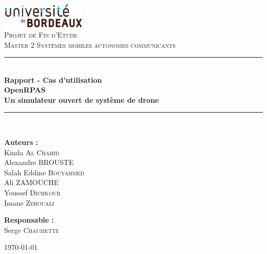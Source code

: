 \documentclass[12pt,a4paper]{article}
\newcommand{\HRule}{\rule{\linewidth}{0.5mm}}
\begin{document}
\begin{titlepage}
\begin{center}

\includegraphics[width=0.3\textwidth]{images/universite_bordeaux_logo.png}\\[1cm]    


\textsc{\Large Projet de Fin d'Etude}\\[0.5cm]
\textsc{\Large Master 2 Systèmes mobiles autonomes communicants}\\[0.5cm]

\vspace{30pt}
\HRule \\[0.4cm]
{ \huge \bfseries Rapport - Cas d'utilisation\\[0.7cm]
OpenRPAS \\[0.5cm]
Un simulateur ouvert
de système de drone}\\[0.4cm]

\HRule \\[1.5cm]

\begin{minipage}{0.4\textwidth}
\begin{flushleft} \large
\textbf{Auteurs :}\\
Kinda \textsc{Al Chahid}\\
Alexandre \textsc{BROUSTE}\\
Salah Eddine  \textsc{Bouyahmed}\\
Ali  \textsc{ZAMOUCHE}\\
Youssef \textsc{Dichkour}\\
Imane \textsc{Zerouali}
\end{flushleft}
\end{minipage}
\begin{minipage}{0.4\textwidth}
\begin{flushright} \large
\textbf{Responsable :} \\
Serge \textsc{Chaumette}\\
\end{flushright}
\end{minipage}

\vfill

{\large \today}

\end{center}

\end{titlepage}
\end{document}
